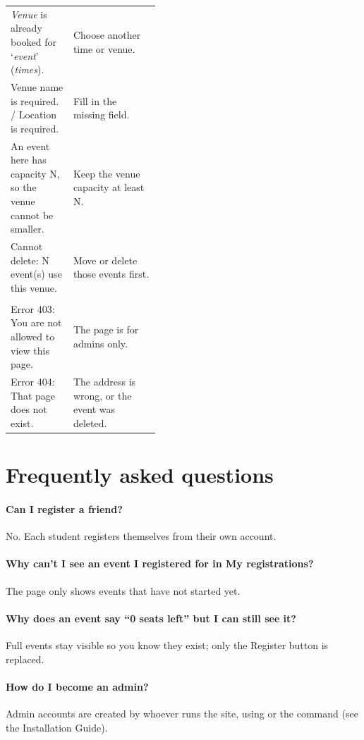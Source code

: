\documentclass[11pt,a4paper]{article}
\begin{document}
\begin{xltabular}{\linewidth}{@{}>{\raggedright\arraybackslash}p{0.42\linewidth} X@{}}
\emph{Venue} is already booked for `\emph{event}' (\emph{times}). & Choose another time or venue. \\
Venue name is required. / Location is required. & Fill in the missing field. \\
An event here has capacity N, so the venue cannot be smaller. & Keep the venue capacity at least N. \\
Cannot delete: N event(s) use this venue. & Move or delete those events first. \\
\midrule
{} \\
Error 403: You are not allowed to view this page. & The page is for admins only. \\
Error 404: That page does not exist. & The address is wrong, or the event was deleted. \\
\bottomrule
\end{xltabular}

\section{Frequently asked questions}

\paragraph{Can I register a friend?} No. Each student registers themselves from their own account.

\paragraph{Why can't I see an event I registered for in My registrations?} The page only shows
events that have not started yet.

\paragraph{Why does an event say ``0 seats left'' but I can still see it?} Full events stay visible
so you know they exist; only the \textsf{Register} button is replaced.

\paragraph{How do I become an admin?} Admin accounts are created by whoever runs the site, using
 or the  command (see the Installation Guide).
\end{document}
